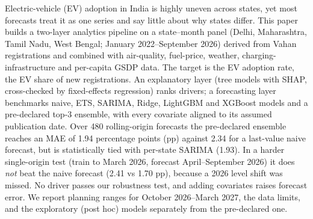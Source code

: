 Electric-vehicle (EV) adoption in India is highly uneven across states, yet most forecasts treat it as one series and say little about why states differ. This paper builds a two-layer analytics pipeline on a state--month panel (Delhi, Maharashtra, Tamil Nadu, West Bengal; January 2022--September 2026) derived from Vahan registrations and combined with air-quality, fuel-price, weather, charging-infrastructure and per-capita GSDP data. The target is the EV adoption rate, the EV share of new registrations. An explanatory layer (tree models with SHAP, cross-checked by fixed-effects regression) ranks drivers; a forecasting layer benchmarks naive, ETS, SARIMA, Ridge, LightGBM and XGBoost models and a pre-declared top-3 ensemble, with every covariate aligned to its assumed publication date. Over 480 rolling-origin forecasts the pre-declared ensemble reaches an MAE of 1.94 percentage points (pp) against 2.34 for a last-value naive forecast, but is statistically tied with per-state SARIMA (1.93). In a harder single-origin test (train to March 2026, forecast April--September 2026) it does \emph{not} beat the naive forecast (2.41 vs 1.70 pp), because a 2026 level shift was missed. No driver passes our robustness test, and adding covariates raises forecast error. We report planning ranges for October 2026--March 2027, the data limits, and the exploratory (post hoc) models separately from the pre-declared one.
